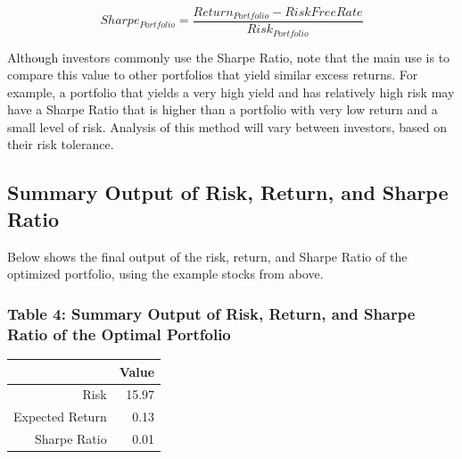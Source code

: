 \documentclass[12pt,english]{article}
\begin{document}
                \begin{singlespace}
                    \begin{center}
                        \begin{equation} \label{Sharpe Ratio}
                            Sharpe_{Portfolio} = 
                            \frac{Return_{Portfolio} - RiskFreeRate}{Risk_{Portfolio}} 
                        \end{equation}
                    \end{center}
                    \end{singlespace}
            \begin{doublespace}
                
            \indent{}
            Although investors commonly use the Sharpe Ratio, note that the main use is to compare this value to other portfolios that yield similar excess returns. For example, a portfolio that yields a very high yield and has relatively high risk may have a Sharpe Ratio that is higher than a portfolio with very low return and a small level of risk. Analysis of this method will vary between investors, based on their risk tolerance.
            
        \subsection{Summary Output of Risk, Return, and Sharpe Ratio}
            \indent{}\indent{}
            Below shows the final output of the risk, return, and Sharpe Ratio of the optimized portfolio, using the example stocks from above.
            
            \subsubsection{Table 4: Summary Output of Risk, Return, and Sharpe Ratio of the Optimal Portfolio}
                \begin{table}[ht]
                \centering
                \begin{tabular}{rr}
                  \hline
                 & Value \\ 
                  \hline
                Risk & 15.97 \\ 
                  Expected Return & 0.13 \\ 
                  Sharpe Ratio & 0.01 \\ 
                   \hline
                \end{tabular}
                \end{table}


\end{doublespace}
\end{document}
